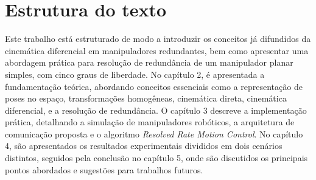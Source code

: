 \section{Estrutura do texto}\label{sec:structure}

Este trabalho está estruturado de modo a introduzir os conceitos já difundidos da cinemática diferencial em manipuladores redundantes,
bem como apresentar uma abordagem prática para resolução de redundância de um manipulador planar simples, com cinco graus de liberdade.
No capítulo 2, é apresentada a fundamentação teórica, abordando conceitos essenciais como a representação de poses no
espaço, transformações homogêneas, cinemática direta, cinemática diferencial, e a resolução de redundância.
O capítulo 3 descreve a implementação prática, detalhando a simulação de manipuladores robóticos, a arquitetura de comunicação proposta
e o algoritmo \emph{Resolved Rate Motion Control}. No capítulo 4, são apresentados os resultados experimentais divididos em dois cenários
distintos, seguidos pela conclusão no capítulo 5, onde são discutidos os principais pontos abordados e sugestões para trabalhos futuros.
